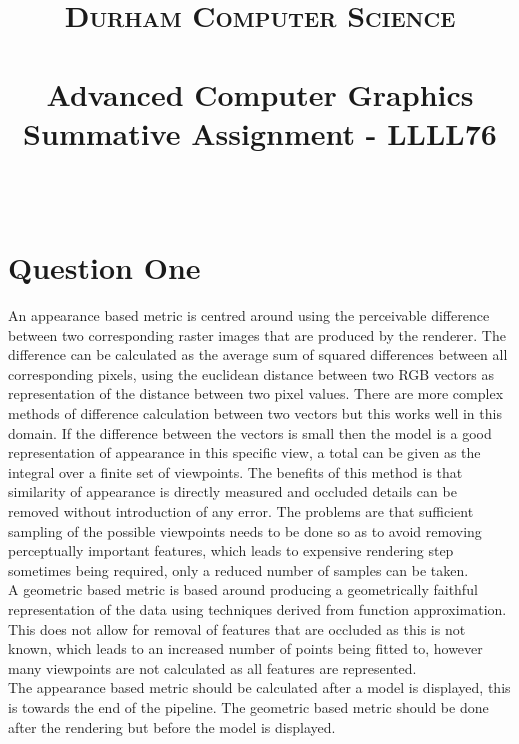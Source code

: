\documentclass[paper=a4, fontsize=11pt]{scrartcl}
\date{}
\title{
		\vspace{-1in} 	
		\usefont{OT1}{bch}{b}{n}
		\normalfont \normalsize \textsc{Durham Computer Science} \\ [5pt]
		\horrule{0.5pt} \\[0.4cm]
		\huge  Advanced Computer Graphics Summative Assignment - LLLL76\\
		\horrule{2pt} \\[0.5cm]
		\vspace{-1in} 	
}
\numberwithin{equation}{section}		%
\numberwithin{figure}{section}			%
\numberwithin{table}{section}				%
\begin{document}
\maketitle

\section*{Question One}

\iffalse
20 marks \\
200 words \\
Compare the main difference between applying appearance-based metric and geometric based
metric to measure the quality difference between two polygon meshes. Analyse in
which part of the graphics rendering pipeline each metric should be applied to perform quality
measurement. \\
\fi

An appearance based metric is centred around using the perceivable difference between two corresponding raster images that are produced by the renderer. The difference can be calculated as the average sum of squared differences between all corresponding pixels, using the euclidean distance between two RGB vectors as representation of the distance between two pixel values. There are more complex methods of difference calculation between two vectors but this works well in this domain. If the difference between the vectors is small then the model is a good representation of appearance in this specific view, a total can be given as the integral over a finite set of viewpoints. The benefits of this method is that similarity of appearance is directly measured and occluded details can be removed without introduction of any error. The problems are that sufficient sampling of the possible viewpoints needs to be done so as to avoid removing perceptually important features, which leads to expensive rendering step sometimes being required, only a reduced number of samples can be taken.\\

A geometric based metric is based around producing a geometrically faithful representation of the data using techniques derived from function approximation. This does not allow for removal of features that are occluded as this is not known, which leads to an increased number of points being fitted to, however many viewpoints are not calculated as all features are represented. \\

The appearance based metric should be calculated after a model is displayed, this is towards the end of the pipeline. The geometric based metric should be done after the rendering but before the model is displayed.
\end{document}

